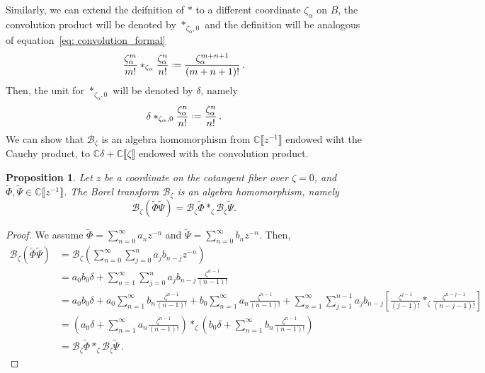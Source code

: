 \documentclass{article}
\newcommand{\C}{\mathbb{C}}
\newcommand{\series}[1]{\tilde{#1}}
\newcommand*{\defeq}{\mathrel{\vcenter{\baselineskip0.5ex \lineskiplimit0pt
                     \hbox{\scriptsize.}\hbox{\scriptsize.}}}%
                     =}
\newcommand{\borel}{\mathcal{B}}
\theoremstyle{definition}
\theoremstyle{plain}
\newtheorem{prop}[definition]{Proposition}
\begin{document}
Similarly, we can extend the deifnition of $\ast$ to a different coordinate $\zeta_\alpha$ on $B$, the convolution product will be denoted by $\ast_{\zeta_\alpha,0}$ and the definition will be analogous of equation~\eqref{eq: convolution_formal}
\begin{equation}
\frac{\zeta_\alpha^m}{m!} \ast_{\zeta_\alpha} \frac{\zeta_\alpha^n}{n!} \defeq \frac{\zeta_\alpha^{m+n+1}}{(m+n+1)!} \,.
\end{equation}
Then, the unit for $\ast_{\zeta_\alpha,0}$ will be denoted by $\delta$, namely \[\delta\ast_{\zeta_\alpha,0}\frac{\zeta_\alpha^n}{n!}\defeq\frac{\zeta_\alpha^n}{n!}\,.\]
We can show that $\borel_\zeta$ is an algebra homomorphism from $\C\llbracket z^{-1}\rrbracket$ endowed wiht the Cauchy product, to $\C\delta+\C\llbracket\zeta\rrbracket$ endowed with the convolution product.
\begin{prop}
    Let $z$ be a coordinate on the cotangent fiber over $\zeta=0$, and $\series{\Phi},\series{\Psi}\in\C\llbracket z^{-1}\rrbracket$. The Borel transform $\borel_\zeta$ is an algebra homomorphism, namely
    \[\borel_\zeta(\series{\Phi}\series{\Psi})=\borel_\zeta\series{\Phi} \ast_\zeta \borel_\zeta\series{\Psi}.\]
\end{prop}
\begin{proof}
    We assume $\series{\Phi}=\sum_{n=0}^\infty a_nz^{-n}$ and $\series{\Psi}=\sum_{n=0}^\infty b_nz^{-n}$. Then,
    \begin{align*}
\borel_\zeta(\series{\Phi}\series{\Psi})&=\borel_\zeta\left(\sum_{n=0}^\infty\sum_{j=0}^na_jb_{n-j}z^{-n}\right)\\
&=a_0b_0\delta +\sum_{n=1}^\infty\sum_{j=0}^na_jb_{n-j}\frac{\zeta^{n-1}}{(n-1)!}\\
&=a_0b_0\delta+a_0\sum_{n=1}^\infty b_{n}\frac{\zeta^{n-1}}{(n-1)!}+b_0\sum_{n=1}^\infty a_n\frac{\zeta^{n-1}}{(n-1)!}+\sum_{n=1}^\infty\sum_{j=1}^{n-1}a_jb_{n-j}\left[\frac{\zeta^{j-1}}{(j-1)!} \ast_\zeta \frac{\zeta^{n-j-1}}{(n-j-1)!}\right]\\
&=\left(a_0\delta+\sum_{n=1}^\infty a_n\frac{\zeta^{n-1}}{(n-1)!}\right)\ast_\zeta\left(b_0\delta+\sum_{n=1}^\infty b_n\frac{\zeta^{n-1}}{(n-1)!}\right)\\
&=\borel_\zeta\series{\Phi} \ast_\zeta \borel_\zeta\series{\Psi}\,.
\end{align*}
\end{proof}
\end{document}
